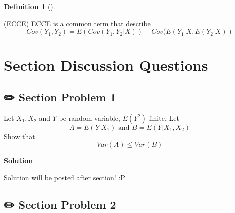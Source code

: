 \documentclass[
  letterpaper,
  DIV=11,
  numbers=noendperiod]{scrreprt}
\theoremstyle{plain}
\theoremstyle{definition}
\newtheorem{definition}{Definition}[chapter]
\theoremstyle{remark}
\begin{document}
\leavevmode{}%
\begin{definition}[]\label{def-ecce}

(ECCE) ECCE is a common term that describe
\[Cov(Y_1, Y_2)=E(Cov(Y_1,Y_2|X))+Cov(E(Y_1|X, E(Y_2|X))\]

\end{definition}

\hypertarget{section-discussion-questions-3}{%
\section*{Section Discussion
Questions}\label{section-discussion-questions-3}}


\hypertarget{section-problem-1-4}{%
\subsection*{✏️ Section Problem 1}\label{section-problem-1-4}}

Let \(X_1, X_2\) and \(Y\) be random variable, \(E(Y^2)\) finite. Let
\[A=E(Y|X_1) \text{ and } B=E(Y|X_1,X_2)\] Show that
\[Var(A) \leq Var(B)\]

\begin{tcolorbox}[enhanced jigsaw, arc=.35mm, colframe=quarto-callout-tip-color-frame, left=2mm, rightrule=.15mm, bottomrule=.15mm, colback=white, toprule=.15mm, opacityback=0, leftrule=.75mm, breakable]
\begin{minipage}[t]{5.5mm}
\textcolor{quarto-callout-tip-color}{\faLightbulb}
\end{minipage}%
\begin{minipage}[t]{\textwidth - 5.5mm}

\textbf{Solution}\vspace{2mm}

Solution will be posted after section! :P

\end{minipage}%
\end{tcolorbox}

\hypertarget{section-problem-2-4}{%
\subsection*{✏️ Section Problem 2}\label{section-problem-2-4}}
\end{document}
